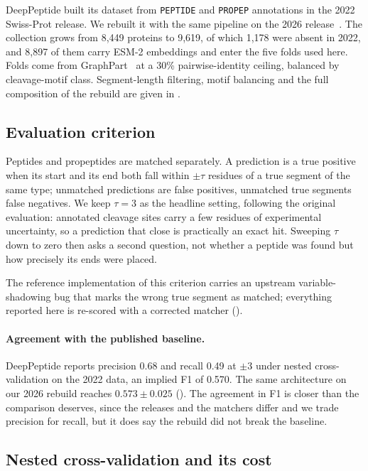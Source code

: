 \documentclass{article}
\begin{document}
DeepPeptide built its dataset from \texttt{PEPTIDE} and \texttt{PROPEP} annotations in the 2022 Swiss-Prot release. We rebuilt it with the same pipeline on the 2026 release~\citep{uniprot2025}. The collection grows from 8{,}449 proteins to 9{,}619, of which 1{,}178 were absent in 2022, and 8{,}897 of them carry ESM-2 embeddings and enter the five folds used here. Folds come from GraphPart~\citep{graphpart2023} at a 30\% pairwise-identity ceiling, balanced by cleavage-motif class. Segment-length filtering, motif balancing and the full composition of the rebuild are given in .

\subsection{Evaluation criterion}
\label{sec:matching}

Peptides and propeptides are matched separately. A prediction is a true positive when its start and its end both fall within $\pm\tau$ residues of a true segment of the same type; unmatched predictions are false positives, unmatched true segments false negatives. We keep $\tau=3$ as the headline setting, following the original evaluation: annotated cleavage sites carry a few residues of experimental uncertainty, so a prediction that close is practically an exact hit. Sweeping $\tau$ down to zero then asks a second question, not whether a peptide was found but how precisely its ends were placed.

The reference implementation of this criterion carries an upstream variable-shadowing bug that marks the wrong true segment as matched; everything reported here is re-scored with a corrected matcher ().

\paragraph{Agreement with the published baseline.} DeepPeptide reports precision 0.68 and recall 0.49 at $\pm3$ under nested cross-validation on the 2022 data, an implied F1 of 0.570. The same architecture on our 2026 rebuild reaches $0.573\pm0.025$ (). The agreement in F1 is closer than the comparison deserves, since the releases and the matchers differ and we trade precision for recall, but it does say the rebuild did not break the baseline.

\subsection{Nested cross-validation and its cost}
\label{sec:eval-protocol}
\end{document}
